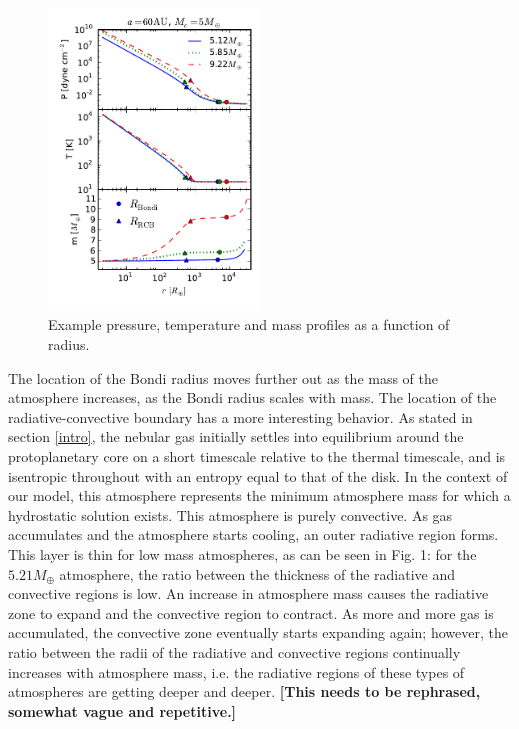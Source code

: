 \documentclass[apj]{emulateapj}
\begin{document}
\begin{figure}[h]
\centering
\includegraphics[width=0.5\textwidth]{../../figs/ModelAtmospheres/RadSelfGravPoly/PaperFigs/PTm_profiles_v2.pdf}
\caption{Example pressure, temperature and mass profiles as a function of radius.}
\end{figure}

The location of the Bondi radius moves further out as the mass of the atmosphere increases, as the Bondi radius scales with mass. The location of the radiative-convective boundary has a more interesting behavior. As stated in section \ref{intro}, the nebular gas initially settles into equilibrium around the protoplanetary core on a short timescale relative to the thermal timescale, and is isentropic throughout with an entropy equal to that of the disk. In the context of our model, this atmosphere represents the minimum atmosphere mass for which a hydrostatic solution exists. This atmosphere is purely convective. As gas accumulates and the atmosphere starts cooling, an outer radiative region forms. This layer is thin for low mass atmospheres, as can be seen in Fig. 1: for the $5.21 M_{\oplus}$ atmosphere, the ratio between the thickness of the radiative and convective regions is low. An increase in atmosphere mass causes the radiative zone to expand and the convective region to contract. As more and more gas is accumulated, the convective zone eventually starts expanding again; however, the ratio between the radii of the radiative and convective regions continually increases with atmosphere mass, i.e. the radiative regions of these types of atmospheres are getting deeper and deeper.  \textbf{[This needs to be rephrased, somewhat vague and repetitive.]}
\end{document}
